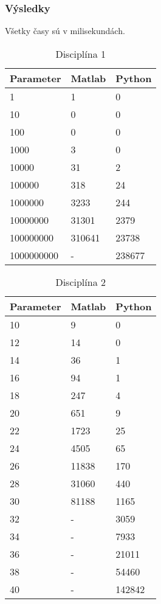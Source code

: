 \documentclass[12pt,a4paper]{article}
\begin{document}
\subsubsection*{Výsledky}

Všetky časy sú v milisekundách.

\begin{longtable}[c]{@{}lll@{}}
\caption{Disciplína 1}
\label{tab:dis1}\\
\toprule
Parameter  & Matlab & Python \\* \midrule
1          & 1      & 0      \\
10         & 0      & 0      \\
100        & 0      & 0      \\
1000       & 3      & 0      \\
10000      & 31     & 2      \\
100000     & 318    & 24     \\
1000000    & 3233   & 244    \\
10000000   & 31301  & 2379   \\
100000000  & 310641 & 23738  \\
1000000000 & -      & 238677 \\* \bottomrule
\end{longtable}

\begin{longtable}[c]{@{}lll@{}}
\caption{Disciplína 2}
\label{tab:dis2}\\
\toprule
Parameter  & Matlab & Python \\* \midrule
10   & 9      & 0      \\
12   & 14     & 0      \\
14   & 36     & 1      \\
16   & 94     & 1      \\
18   & 247    & 4      \\
20   & 651    & 9      \\
22   & 1723   & 25     \\
24   & 4505   & 65     \\
26   & 11838  & 170    \\
28   & 31060  & 440    \\
30   & 81188  & 1165   \\
32   & -      & 3059   \\
34   & -      & 7933   \\
36   & -      & 21011  \\
38   & -      & 54460  \\
40   & -      & 142842 \\* \bottomrule
\end{longtable}
\end{document}
